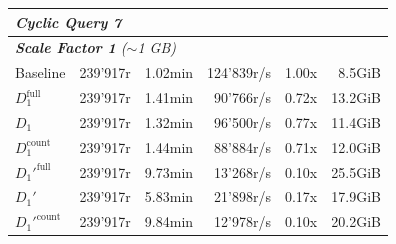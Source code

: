 \begin{longtable}{lrrrrr}
    \multicolumn{6}{l}{\textit{Cyclic Query 7}} \\
    \midrule
    \multicolumn{6}{l}{\textit{\textbf{Scale Factor 1} ($\sim$1 GB)}} \\
    \nopagebreak
    Baseline              &  239'917r             &  1.02min             &  124'839r/s          & 1.00x             & 8.5GiB    \\
    $D_1^{\text{full}}$   &  239'917r             &  1.41min             &  90'766r/s           & 0.72x             & 13.2GiB   \\
    \quad $D_1$           &  239'917r             &  1.32min             &  96'500r/s           & 0.77x             & 11.4GiB   \\
    $D_1^{\text{count}}$  &  239'917r             &  1.44min             &  88'884r/s           & 0.71x             & 12.0GiB   \\
    $D_1'^{\text{full}}$  &  239'917r             &  9.73min            &  13'268r/s           & 0.10x             & 25.5GiB   \\
    \quad $D_1'$          &  239'917r             &  5.83min             &  21'898r/s           & 0.17x             & 17.9GiB   \\
    $D_1'^{\text{count}}$ &  239'917r             &  9.84min            &  12'978r/s             & 0.10x             & 20.2GiB   \\
    
    \bottomrule

\end{longtable}


